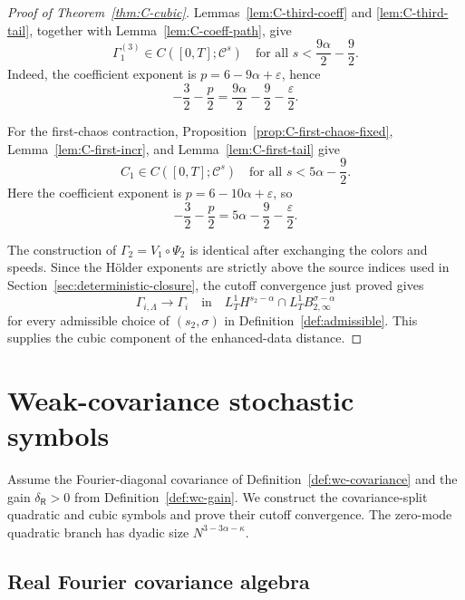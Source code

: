 \documentclass[10pt]{amsart}
\numberwithin{equation}{section}
\theoremstyle{plain}
\theoremstyle{definition}
\theoremstyle{remark}
\newcommand{\C}{\mathcal{C}}
\newcommand{\eps}{\varepsilon}
\begin{document}
\begin{proof}[Proof of Theorem~\ref{thm:C-cubic}]
Lemmas~\ref{lem:C-third-coeff} and \ref{lem:C-third-tail}, together with Lemma~\ref{lem:C-coeff-path}, give
\[
        \Gamma_1^{(3)}\in C([0,T];\C^s)
        \quad\text{for all }s<\frac{9\alpha}{2}-\frac92.
\]
Indeed, the coefficient exponent is \(p=6-9\alpha+\eps\), hence
\[
        -\frac32-\frac p2
        =\frac{9\alpha}{2}-\frac92-\frac\eps2.
\]

For the first-chaos contraction, Proposition~\ref{prop:C-first-chaos-fixed}, Lemma~\ref{lem:C-first-incr}, and Lemma~\ref{lem:C-first-tail} give
\[
        C_1\in C([0,T];\C^s)
        \quad\text{for all }s<5\alpha-\frac92.
\]
Here the coefficient exponent is \(p=6-10\alpha+\eps\), so
\[
        -\frac32-\frac p2
        =5\alpha-\frac92-\frac\eps2.
\]

The construction of \(\Gamma_2=V_1\circ\Psi_2\) is identical after exchanging the colors and speeds.  Since the H\"older exponents are strictly above the source indices used in Section~\ref{sec:deterministic-closure}, the cutoff convergence just proved gives
\[
        \Gamma_{i,\Lambda}\to\Gamma_i
        \quad\text{in}\quad
        L_T^1H^{s_2-\alpha}\cap L_T^1B_{2,\infty}^{\sigma-\alpha}
\]
for every admissible choice of $(s_2,\sigma)$ in Definition~\ref{def:admissible}.  This supplies the cubic component of the enhanced-data distance.

\end{proof}




\section{Weak-covariance stochastic symbols}\label{app:weak-covariance-symbols}

Assume the Fourier-diagonal covariance of Definition~\ref{def:wc-covariance} and the gain \(\delta_{\mathsf R}>0\) from Definition~\ref{def:wc-gain}.  We construct the covariance-split quadratic and cubic symbols and prove their cutoff convergence.  The zero-mode quadratic branch has dyadic size \(N^{3-3\alpha-\kappa}\).

\subsection{Real Fourier covariance algebra}
\end{document}
